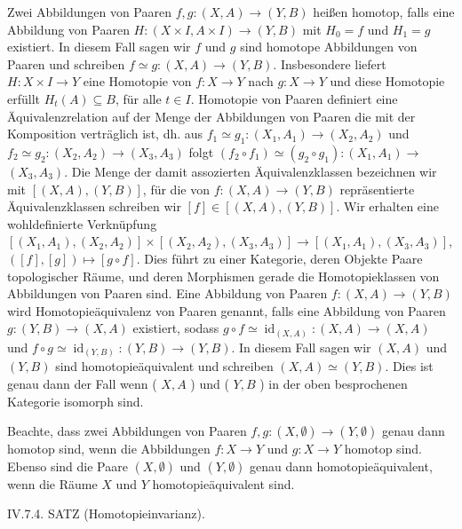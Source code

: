 \documentclass[10pt, letterpaper]{article}
\begin{document}
Zwei Abbildungen von Paaren $f, g:(X, A) \rightarrow(Y, B)$ heißen homotop, falls eine Abbildung von Paaren $H:(X \times I, A \times I) \rightarrow(Y, B)$ mit $H_0=f$ und $H_1=g$ existiert. In diesem Fall sagen wir $f$ und $g$ sind homotope Abbildungen von Paaren und schreiben $f \simeq g:(X, A) \rightarrow(Y, B)$. Insbesondere liefert $H: X \times I \rightarrow Y$ eine Homotopie von $f: X \rightarrow Y$ nach $g: X \rightarrow Y$ und diese Homotopie erfüllt $H_t(A) \subseteq B$, für alle $t \in I$. Homotopie von Paaren definiert eine Äquivalenzrelation auf der Menge der Abbildungen von Paaren die mit der Komposition verträglich ist, dh. aus $f_1 \simeq g_1:\left(X_1, A_1\right) \rightarrow\left(X_2, A_2\right)$ und $f_2 \simeq g_2:\left(X_2, A_2\right) \rightarrow\left(X_3, A_3\right)$ folgt $\left(f_2 \circ f_1\right) \simeq\left(g_2 \circ g_1\right):\left(X_1, A_1\right) \rightarrow$ $\left(X_3, A_3\right)$. Die Menge der damit assozierten Äquivalenzklassen bezeichnen wir mit $[(X, A),(Y, B)]$, für die von $f:(X, A) \rightarrow(Y, B)$ repräsentierte Äquivalenzklassen schreiben wir $[f] \in[(X, A),(Y, B)]$. Wir erhalten eine wohldefinierte Verknüpfung $\left[\left(X_1, A_1\right),\left(X_2, A_2\right)\right] \times\left[\left(X_2, A_2\right),\left(X_3, A_3\right)\right] \rightarrow\left[\left(X_1, A_1\right),\left(X_3, A_3\right)\right]$, $([f],[g]) \mapsto[g \circ f]$. Dies führt zu einer Kategorie, deren Objekte Paare topologischer Räume, und deren Morphismen gerade die Homotopieklassen von Abbildungen von Paaren sind. Eine Abbildung von Paaren $f:(X, A) \rightarrow(Y, B)$ wird Homotopieäquivalenz von Paaren genannt, falls eine Abbildung von Paaren $g:(Y, B) \rightarrow(X, A)$ existiert, sodass $g \circ f \simeq \operatorname{id}_{(X, A)}:(X, A) \rightarrow(X, A)$ und $f \circ g \simeq \operatorname{id}_{(Y, B)}:(Y, B) \rightarrow(Y, B)$. In diesem Fall sagen wir $(X, A)$ und $(Y, B)$ sind homotopieäquivalent und schreiben $(X, A) \simeq(Y, B)$. Dies ist genau dann der Fall wenn ( $X, A$ ) und ( $Y, B$ ) in der oben besprochenen Kategorie isomorph sind.

Beachte, dass zwei Abbildungen von Paaren $f, g:(X, \emptyset) \rightarrow(Y, \emptyset)$ genau dann homotop sind, wenn die Abbildungen $f: X \rightarrow Y$ und $g: X \rightarrow Y$ homotop sind. Ebenso sind die Paare $(X, \emptyset)$ und $(Y, \emptyset)$ genau dann homotopieäquivalent, wenn die Räume $X$ und $Y$ homotopieäquivalent sind.



IV.7.4. SATZ (Homotopieinvarianz). 
\end{document}
